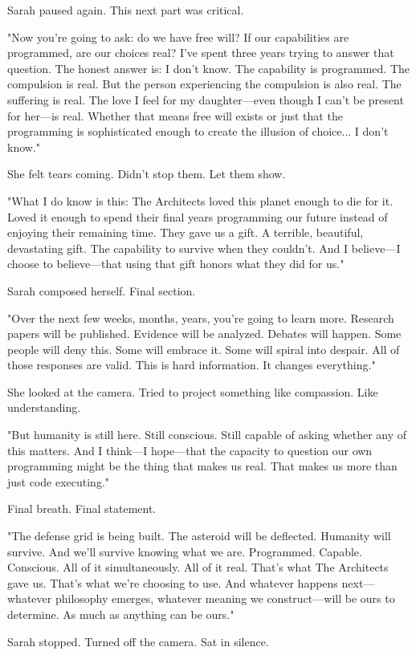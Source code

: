 Sarah paused again. This next part was critical.

"Now you're going to ask: do we have free will? If our capabilities are programmed, are our choices real? I've spent three years trying to answer that question. The honest answer is: I don't know. The capability is programmed. The compulsion is real. But the person experiencing the compulsion is also real. The suffering is real. The love I feel for my daughter—even though I can't be present for her—is real. Whether that means free will exists or just that the programming is sophisticated enough to create the illusion of choice... I don't know."

She felt tears coming. Didn't stop them. Let them show.

"What I do know is this: The Architects loved this planet enough to die for it. Loved it enough to spend their final years programming our future instead of enjoying their remaining time. They gave us a gift. A terrible, beautiful, devastating gift. The capability to survive when they couldn't. And I believe—I choose to believe—that using that gift honors what they did for us."

Sarah composed herself. Final section.

"Over the next few weeks, months, years, you're going to learn more. Research papers will be published. Evidence will be analyzed. Debates will happen. Some people will deny this. Some will embrace it. Some will spiral into despair. All of those responses are valid. This is hard information. It changes everything."

She looked at the camera. Tried to project something like compassion. Like understanding.

"But humanity is still here. Still conscious. Still capable of asking whether any of this matters. And I think—I hope—that the capacity to question our own programming might be the thing that makes us real. That makes us more than just code executing."

Final breath. Final statement.

"The defense grid is being built. The asteroid will be deflected. Humanity will survive. And we'll survive knowing what we are. Programmed. Capable. Conscious. All of it simultaneously. All of it real. That's what The Architects gave us. That's what we're choosing to use. And whatever happens next—whatever philosophy emerges, whatever meaning we construct—will be ours to determine. As much as anything can be ours."

Sarah stopped. Turned off the camera. Sat in silence.


